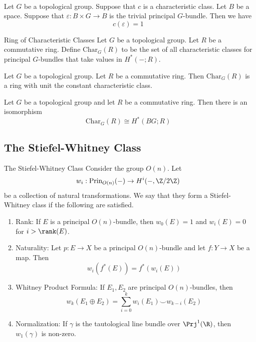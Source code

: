 \documentclass[a4paper]{article}
\begin{document}
\begin{eg}{}{}\\
Let $G$ be a topological group. Suppose that $c$ is a characteristic class. Let $B$ be a space. Suppose that $\varepsilon:B\times G\to B$ is the trivial principal $G$-bundle. Then we have $$c(\varepsilon)=1$$
\end{eg}

\begin{defn}{Ring of Characteristic Classes}{} Let $G$ be a topological group. Let $R$ be a commutative ring. Define $\text{Char}_G(R)$ to be the set of all characteristic classes for principal $G$-bundles that take values in $H^\ast(-;R)$. 
\end{defn}

\begin{prp}{}{} Let $G$ be a topological group. Let $R$ be a commutative ring. Then $\text{Char}_G(R)$ is a ring with unit the constant characteristic class. 
\end{prp}

\begin{thm}{}{} Let $G$ be a topological group and let $R$ be a commutative ring. Then there is an isomorphism $$\text{Char}_G(R)\cong H^\ast(BG;R)$$
\end{thm}

\subsection{The Stiefel-Whitney Class}
\begin{defn}{The Stiefel-Whitney Class}{} Consider the group $O(n)$. Let $$w_i:\text{Prin}_{O(n)}(-)\to H^i(-,\Z/2\Z)$$ be a collection of natural transformations. We say that they form a Stiefel-Whitney class if the following are satisfied. 
\begin{enumerate}
\item Rank: If $E$ is a principal $O(n)$-bundle, then $w_0(E)=1$ and $w_i(E)=0$ for $i>\rank(E)$. 
\item Naturality: Let $p:E\to X$ be a principal $O(n)$-bundle and let $f:Y\to X$ be a map. Then $$w_i(f^\ast(E))=f^\ast(w_i(E))$$
\item Whitney Product Formula: If $E_1,E_2$ are principal $O(n)$-bundles, then $$w_k(E_1\oplus E_2)=\sum_{i=0}^kw_i(E_1)\smile w_{k-i}(E_2)$$
\item Normalization: If $\gamma$ is the tautological line bundle over $\Prj^1(\R)$, then $w_1(\gamma)$ is non-zero. 
\end{enumerate}
\end{defn}
\end{document}
